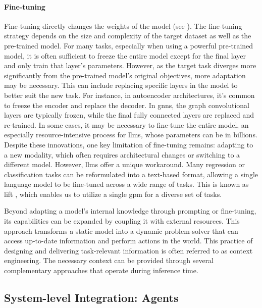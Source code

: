 \paragraph{Fine-tuning} \label{sec:fine-tuning} 
Fine-tuning directly changes the weights of the model (see ). 
The fine-tuning strategy depends on the size and complexity of the target dataset as well as the pre-trained model. For many tasks, especially when using a powerful pre-trained model, it is often sufficient to freeze the entire model except for the final layer and only train that layer's parameters. 
However, as the target task diverges more significantly from the pre-trained model’s original objectives, more adaptation may be necessary. This can include replacing specific layers in the model to better suit the new task. 
For instance, in autoencoder architectures, it's common to freeze the encoder and replace the decoder. In \glspl{gnn}, the graph convolutional layers are typically frozen, while the final fully connected layers are replaced and re-trained. In some cases, it may be necessary to fine-tune the entire model, an especially resource-intensive process for \glspl{llm}, whose parameters can be in billions.
Despite these innovations, one key limitation of fine-tuning remains: adapting to a new modality, which often requires architectural changes or switching to a different model. However, \glspl{llm} offer a unique workaround. Many regression or classification tasks can be reformulated into a text-based format, allowing a single language model to be fine-tuned across a wide range of tasks. This is known as \gls{lift} \autocite{dinh2022lift}, which enables us to utilize a single \gls{gpm} for a diverse set of tasks.

Beyond adapting a model's internal knowledge through prompting or fine-tuning, its capabilities can be expanded by coupling it with external resources. This approach transforms a static model into a dynamic problem-solver that can access up-to-date information and perform actions in the world. This practice of designing and delivering task-relevant information is often referred to as context engineering. The necessary context can be provided through several complementary approaches that operate during inference time. 

\subsection{System-level Integration: Agents} \label{sec:agents}

